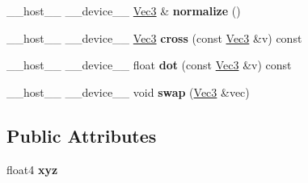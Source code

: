 \begin{DoxyCompactItemize}
\item 
\+\_\+\+\_\+host\+\_\+\+\_\+ \+\_\+\+\_\+device\+\_\+\+\_\+ \hyperlink{class_vec3}{Vec3} \& {\bfseries normalize} ()\hypertarget{class_vec3_aaeb17c15d3cbdc7e3d8981b7f0f49b51}{}\label{class_vec3_aaeb17c15d3cbdc7e3d8981b7f0f49b51}

\item 
\+\_\+\+\_\+host\+\_\+\+\_\+ \+\_\+\+\_\+device\+\_\+\+\_\+ \hyperlink{class_vec3}{Vec3} {\bfseries cross} (const \hyperlink{class_vec3}{Vec3} \&v) const\hypertarget{class_vec3_a7dbe7c404cdda8d7f40c398b2fd2eeba}{}\label{class_vec3_a7dbe7c404cdda8d7f40c398b2fd2eeba}

\item 
\+\_\+\+\_\+host\+\_\+\+\_\+ \+\_\+\+\_\+device\+\_\+\+\_\+ float {\bfseries dot} (const \hyperlink{class_vec3}{Vec3} \&v) const\hypertarget{class_vec3_aabc0167d8027104b5b9d7380cdda9b66}{}\label{class_vec3_aabc0167d8027104b5b9d7380cdda9b66}

\item 
\+\_\+\+\_\+host\+\_\+\+\_\+ \+\_\+\+\_\+device\+\_\+\+\_\+ void {\bfseries swap} (\hyperlink{class_vec3}{Vec3} \&vec)\hypertarget{class_vec3_a03632ba5412c9f2048004e2f208d7bb4}{}\label{class_vec3_a03632ba5412c9f2048004e2f208d7bb4}

\end{DoxyCompactItemize}
\subsection*{Public Attributes}
\begin{DoxyCompactItemize}
\item 
float4 {\bfseries xyz}\hypertarget{class_vec3_a1eaa5d966de592d952b54b363987150f}{}\label{class_vec3_a1eaa5d966de592d952b54b363987150f}

\end{DoxyCompactItemize}

